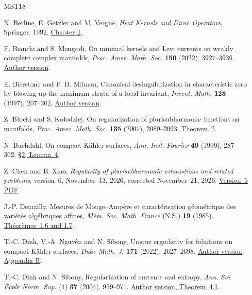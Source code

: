 \documentclass[11pt]{amsart}
\theoremstyle{remark}
\numberwithin{equation}{section}
\begin{document}
\begin{thebibliography}{MST18}

 N. Berline, E. Getzler and M. Vergne,
\emph{Heat Kernels and Dirac Operators}, Springer, 1992,
\href{https://doi.org/10.1007/978-3-642-58088-8}{Chapter 2}.

 F. Bianchi and S. Mongodi,
On minimal kernels and Levi currents on weakly complete complex manifolds,
\emph{Proc. Amer. Math. Soc.} \textbf{150} (2022), 3927--3939.
\href{https://arxiv.org/abs/2102.05328}{Author version}.

 E. Bierstone and P. D. Milman,
Canonical desingularization in characteristic zero by blowing up the
maximum strata of a local invariant, \emph{Invent. Math.}
\textbf{128} (1997), 207--302.
\href{https://arxiv.org/abs/alg-geom/9508005}{Author version}.

 Z. B{\l}ocki and S. Ko{\l}odziej,
On regularization of plurisubharmonic functions on manifolds,
\emph{Proc. Amer. Math. Soc.} \textbf{135} (2007), 2089--2093.
\href{https://gamma.im.uj.edu.pl/~blocki/publ/appr.pdf}{Theorem~2}.

 N. Buchdahl, On compact K\"ahler surfaces,
\emph{Ann. Inst. Fourier} \textbf{49} (1999), 287--302.
\href{https://www.numdam.org/article/AIF_1999__49_1_287_0.pdf}{\S2, Lemma~4}.

 Z. Chen and B. Xiao,
\emph{Regularity of plurisubharmonic exhaustions and related problems},
version~6, November~13, 2026, corrected November~21, 2026.
\href{https://github.com/chen-zhijian/psh-exhaustion/blob/1b5f01d58e0b29629c64803f38d3d03eea40d6ad/papers/paper_v6.pdf}{Version~6 PDF}.

 J.-P. Demailly, Mesures de Monge--Amp\`ere et
caract\'erisation g\'eom\'etrique des vari\'et\'es alg\'ebriques affines,
\emph{M\'em. Soc. Math. France} (N.S.) \textbf{19} (1985).
\href{https://doi.org/10.24033/msmf.320}{Th\'eor\`emes~1.6 and 1.7}.

 T.-C. Dinh, V.-A. Nguy\^en and N. Sibony,
Unique ergodicity for foliations on compact K\"ahler surfaces,
\emph{Duke Math. J.} \textbf{171} (2022), 2627--2698.
\href{https://arxiv.org/abs/1811.07450}{Author version, Appendix B}.

 T.-C. Dinh and N. Sibony,
Regularization of currents and entropy, \emph{Ann. Sci. \'Ecole
Norm. Sup.} (4) \textbf{37} (2004), 959--971.
\href{https://arxiv.org/abs/math/0407532}{Author version, Theorem~4.1}.


\end{thebibliography}
\end{document}
